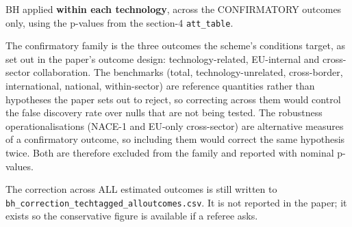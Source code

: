 \documentclass[
]{article}
\begin{document}
BH applied \textbf{within each technology}, across the CONFIRMATORY
outcomes only, using the p-values from the section-4
\texttt{att\_table}.

The confirmatory family is the three outcomes the scheme's conditions
target, as set out in the paper's outcome design: technology-related,
EU-internal and cross-sector collaboration. The benchmarks (total,
technology-unrelated, cross-border, international, national,
within-sector) are reference quantities rather than hypotheses the paper
sets out to reject, so correcting across them would control the false
discovery rate over nulls that are not being tested. The robustness
operationalisations (NACE-1 and EU-only cross-sector) are alternative
measures of a confirmatory outcome, so including them would correct the
same hypothesis twice. Both are therefore excluded from the family and
reported with nominal p-values.

The correction across ALL estimated outcomes is still written to
\texttt{bh\_correction\_techtagged\_alloutcomes.csv}. It is not reported
in the paper; it exists so the conservative figure is available if a
referee asks.
\end{document}
